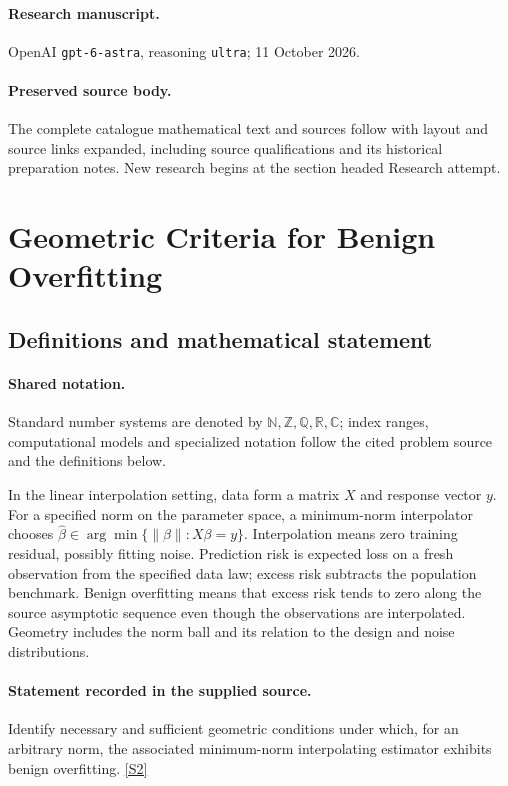 \documentclass[11pt]{article}
\begin{document}
\paragraph{Research manuscript.} OpenAI \texttt{gpt-6-astra}, reasoning \texttt{ultra}; 11 October 2026.
\paragraph{Preserved source body.} The complete catalogue mathematical text and sources follow with layout and source links expanded, including source qualifications and its historical preparation notes. New research begins at the section headed Research attempt.

\section{Geometric Criteria for Benign Overfitting}\label{statement}

\subsection{Definitions and mathematical statement}

\paragraph{Shared notation.}Standard number systems are denoted by $\mathbb N,\mathbb Z,\mathbb Q,\mathbb R,\mathbb C$; index ranges, computational models and specialized notation follow the cited problem source and the definitions below.


In the linear interpolation setting, data form a matrix $X$ and response vector $y$. For a specified norm on the parameter space, a minimum-norm interpolator chooses $\widehat\beta\in\arg\min\{\lVert\beta\rVert:X\beta=y\}$. Interpolation means zero training residual, possibly fitting noise. Prediction risk is expected loss on a fresh observation from the specified data law; excess risk subtracts the population benchmark. Benign overfitting means that excess risk tends to zero along the source asymptotic sequence even though the observations are interpolated. Geometry includes the norm ball and its relation to the design and noise distributions.
\paragraph{Statement recorded in the supplied source.}
Identify necessary and sufficient geometric conditions under which, for an arbitrary norm, the associated minimum-norm interpolating estimator exhibits benign overfitting. \href{https://doi.org/10.4171/owr/2023/41}{[S2]}
\end{document}
